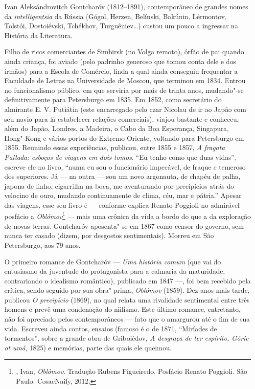 Ivan Aleksándrovitch Gontcharóv (1812--1891), contemporâneo de grandes
nomes da \emph{intelligentsia} da Rússia (Gógol, Herzen, Belínski,
Bakúnin, Lérmontov, Tolstói, Dostoiévski, Tchékhov,
Turguêniev\ldots{}) custou um pouco a ingressar na História da
Literatura. 

Filho de ricos comerciantes de Simbirsk (no Volga remoto), órfão de
pai quando ainda criança, foi aviado (pelo padrinho generoso que
tomou conta dele e dos irmãos) para a Escola de Comércio, finda a
qual ainda conseguiu frequentar a Faculdade de Letras na Universidade
de Moscou, que terminou em 1834. Entrou no funcionalismo público, em
que serviria por mais de trinta anos, mudando"-se definitivamente para
Petersburgo em 1835. Em 1852, como secretário do almirante E. V.
Putiátin (este encarregado pelo czar Nicolau  de ir ao
Japão com seu navio para lá estabelecer relações comerciais), viajou
bastante e conheceu, além do Japão, Londres, a Madeira, o Cabo da Boa
Esperança, Singapura, Hong"-Kong e vários portos do Extremo Oriente,
voltando para Petersburgo em 1855. Reunindo essas experiências,
publicou, entre 1855 e 1857, \emph{A fragata Pallada: esboços de
viagens em dois tomos}. ``Eu tenho como que duas vidas'', escreve
ele no livro, ``numa eu sou o funcionário impecável, de fraque e
temeroso dos superiores. Já --- na outra --- sou um novo argonauta,
de chapéu de palha, japona de linho, cigarrilha na boca, me
aventurando por precipícios atrás do velocino de ouro, mudando
continuamente de clima, céu, mar e pátria.'' Apesar das viagens,
esse seu livro é --- conforme explica Renato Poggioli no admirável
posfácio a \emph{Oblómov}\footnote{, Ivan,
\emph{Oblómov}. Tradução Rubens Figueiredo. Posfácio Renato Poggioli.
São Paulo: CosacNaify, 2012.} --- mais uma crônica da vida a bordo do
que a da exploração de novas terras. Gontcharóv aposenta"-se em 1867
como censor do governo, sem nunca ter casado (dizem, por desgostos
sentimentais). Morreu em São Petersburgo, aos 79 anos. 

O primeiro romance  de Gontcharóv --- \emph{Uma história comum} (que vai do entusiasmo da juventude do protagonista para a calmaria da maturidade, contrariando o idealismo romântico), publicado em 1847 ---, foi bem recebido pela crítica, sendo seguido por sua obra"-prima, \emph{Oblómov} (1859). Dez anos mais tarde, publicou \emph{O precipício} (1869), no qual relata uma rivalidade sentimental entre três homens e prevê uma condenação do niilismo. Este último romance, entretanto, não foi apreciado pelos contemporâneos --- fato que o amargurou até o fim de sua vida. Escreveu ainda contos, ensaios (famoso é o de 1871, ``Miríades de tormentos'', sobre a grande obra de Griboiédov, \emph{A desgraça de ter espírito, Górie ot umá}, 1825) e memórias, parte das quais ele queimou. 

